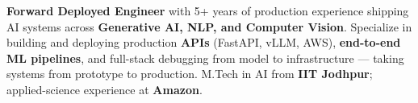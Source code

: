 \documentclass[letter,10pt]{article}
\begin{document}

\textbf{Forward Deployed Engineer} with 5+ years of production experience shipping AI systems across \textbf{Generative AI, NLP, and Computer Vision}.
Specialize in building and deploying production \textbf{APIs} (FastAPI, vLLM, AWS), \textbf{end-to-end ML pipelines}, and full-stack debugging from model to infrastructure — taking systems from prototype to production.
M.Tech in AI from \textbf{IIT Jodhpur}; applied-science experience at \textbf{Amazon}.
\end{document}
